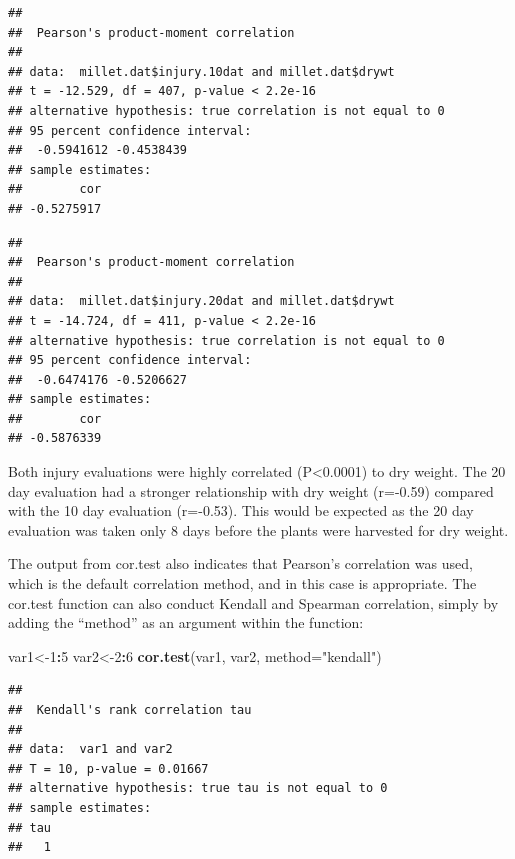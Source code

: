 \documentclass[letterpaper,]{book}
\newenvironment{Shaded}{\begin{snugshade}}{\end{snugshade}}
\newcommand{\DataTypeTok}[1]{\textcolor[rgb]{0.13,0.29,0.53}{#1}}
\newcommand{\DecValTok}[1]{\textcolor[rgb]{0.00,0.00,0.81}{#1}}
\newcommand{\FloatTok}[1]{\textcolor[rgb]{0.00,0.00,0.81}{#1}}
\newcommand{\KeywordTok}[1]{\textcolor[rgb]{0.13,0.29,0.53}{\textbf{#1}}}
\newcommand{\NormalTok}[1]{#1}
\newcommand{\OperatorTok}[1]{\textcolor[rgb]{0.81,0.36,0.00}{\textbf{#1}}}
\newcommand{\StringTok}[1]{\textcolor[rgb]{0.31,0.60,0.02}{#1}}
\begin{document}
\begin{verbatim}
## 
##  Pearson's product-moment correlation
## 
## data:  millet.dat$injury.10dat and millet.dat$drywt
## t = -12.529, df = 407, p-value < 2.2e-16
## alternative hypothesis: true correlation is not equal to 0
## 95 percent confidence interval:
##  -0.5941612 -0.4538439
## sample estimates:
##        cor 
## -0.5275917
\end{verbatim}

\begin{Shaded}
\end{Shaded}

\begin{verbatim}
## 
##  Pearson's product-moment correlation
## 
## data:  millet.dat$injury.20dat and millet.dat$drywt
## t = -14.724, df = 411, p-value < 2.2e-16
## alternative hypothesis: true correlation is not equal to 0
## 95 percent confidence interval:
##  -0.6474176 -0.5206627
## sample estimates:
##        cor 
## -0.5876339
\end{verbatim}

Both injury evaluations were highly correlated (P\textless{}0.0001) to dry weight. The 20 day evaluation had a stronger relationship with dry weight (r=-0.59) compared with the 10 day evaluation (r=-0.53). This would be expected as the 20 day evaluation was taken only 8 days before the plants were harvested for dry weight.

The output from cor.test also indicates that Pearson's correlation was used, which is the default correlation method, and in this case is appropriate. The cor.test function can also conduct Kendall and Spearman correlation, simply by adding the ``method'' as an argument within the function:

\begin{Shaded}
\begin{Highlighting}[]
\NormalTok{var1<-}\DecValTok{1}\OperatorTok{:}\DecValTok{5}
\NormalTok{var2<-}\DecValTok{2}\OperatorTok{:}\DecValTok{6}
\KeywordTok{cor.test}\NormalTok{(var1, var2, }\DataTypeTok{method=}\StringTok{"kendall"}\NormalTok{) }
\end{Highlighting}
\end{Shaded}

\begin{verbatim}
## 
##  Kendall's rank correlation tau
## 
## data:  var1 and var2
## T = 10, p-value = 0.01667
## alternative hypothesis: true tau is not equal to 0
## sample estimates:
## tau 
##   1
\end{verbatim}
\end{document}
